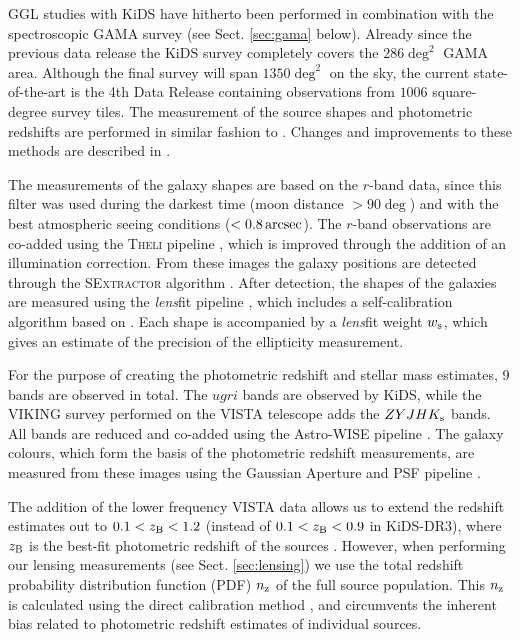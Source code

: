 \documentclass[usenatbib]{mnras}
\newcommand{\as}{\, {\rm arcsec}}
\newcommand{\un}[1]{_{\rm #1}}
\begin{document}
GGL studies with KiDS have hitherto been performed in combination with the spectroscopic GAMA survey (see Sect. \ref{sec:gama} below). Already since the previous data release \cite[KiDS-DR3,][]{dejong2017} the KiDS survey completely covers the $286 \deg^2$ GAMA area. Although the final survey will span $1350 \deg^2$ on the sky, the current state-of-the-art is the 4th Data Release \cite[KiDS-DR4,][]{kuijken2019} containing observations from $1006$ square-degree survey tiles. The measurement of the source shapes and photometric redshifts are performed in similar fashion to \cite{dejong2017}. Changes and improvements to these methods are described in \cite{kuijken2019}. 

The measurements of the galaxy shapes are based on the $r$-band data, since this filter was used during the darkest time (moon distance $> 90 \deg$) and with the best atmospheric seeing conditions ($<0.8 \as$). The $r$-band observations are co-added using the {\scshape Theli} pipeline \cite[]{erben2013}, which is improved through the addition of an illumination correction. From these images the galaxy positions are detected through the {\scshape SExtractor} algorithm \cite[]{bertin1996}. After detection, the shapes of the galaxies are measured using the \emph{lens}fit pipeline \cite[]{miller2007,miller2013}, which includes a self-calibration algorithm based on \cite{fenechconti2017}. Each shape is accompanied by a \emph{lens}fit weight $w\un{s}$, which gives an estimate of the precision of the ellipticity measurement.

For the purpose of creating the photometric redshift and stellar mass estimates, 9 bands are observed in total. The $ugri$ bands are observed by KiDS, while the VIKING survey \cite[]{edge2013} performed on the VISTA telescope adds the $ZYJHK\un{s}$ bands. All bands are reduced and co-added using the Astro-WISE pipeline \cite[AW,][]{mcfarland2013}. The galaxy colours, which form the basis of the photometric redshift measurements, are measured from these images using the Gaussian Aperture and PSF pipeline \cite[GAaP,][]{kuijken2008,kuijken2015}.

The addition of the lower frequency VISTA data allows us to extend the redshift estimates out to $0.1<z\un{B}<1.2$ (instead of $0.1<z\un{B}<0.9$ in KiDS-DR3), where $z\un{B}$ is the best-fit photometric redshift of the sources \cite[]{benitez2000,hildebrandt2012}. However, when performing our lensing measurements (see Sect. \ref{sec:lensing}) we use the total redshift probability distribution function (PDF) $n\un{z}$ of the full source population. This $n\un{z}$ is calculated using the direct calibration method \cite[DIR,][]{hildebrandt2017}, and circumvents the inherent bias related to photometric redshift estimates of individual sources.
\end{document}
